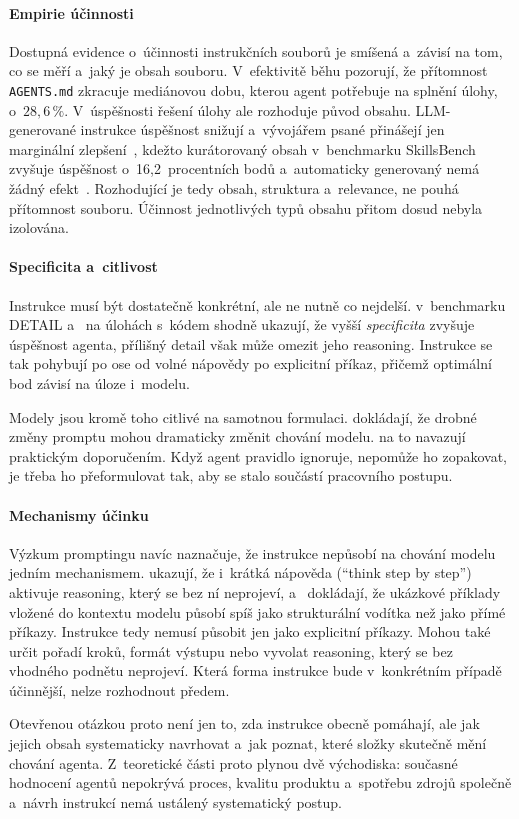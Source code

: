 \paragraph{Empirie účinnosti}
Dostupná evidence o~účinnosti instrukčních souborů je smíšená
a~závisí na tom, co se měří a~jaký je obsah souboru. V~efektivitě
běhu \textcite{lulla2026} pozorují, že přítomnost
\texttt{AGENTS.md} zkracuje mediánovou dobu, kterou agent
potřebuje na splnění úlohy, o~$28{,}6\,\%$. V~úspěšnosti řešení
úlohy ale rozhoduje původ obsahu. LLM-generované instrukce
úspěšnost snižují a~vývojářem psané přinášejí jen marginální
zlepšení~\cite{gloaguen2025agentsmd}, kdežto kurátorovaný obsah
v~benchmarku SkillsBench zvyšuje úspěšnost o~16,2~procentních
bodů a~automaticky generovaný nemá žádný
efekt~\cite{skillsbench2025}. Rozhodující je tedy obsah, struktura
a~relevance, ne pouhá přítomnost souboru. Účinnost jednotlivých
typů obsahu přitom dosud nebyla izolována.

\paragraph{Specificita a~citlivost}
Instrukce musí být dostatečně konkrétní, ale ne nutně co nejdelší.
\textcite{kim2025detail} v~benchmarku DETAIL a~\textcite{zi2025specificity}
na úlohách s~kódem shodně ukazují, že vyšší
\textit{specificita} zvyšuje úspěšnost agenta, přílišný detail
však může omezit jeho reasoning. Instrukce se tak pohybují po ose
od volné nápovědy po explicitní příkaz, přičemž optimální bod závisí
na úloze i~modelu.

Modely jsou kromě toho citlivé na samotnou formulaci. \textcite{razavi2025} dokládají, že drobné změny promptu
mohou dramaticky změnit chování modelu. \textcite{breunig2025}
na to navazují praktickým doporučením. Když agent pravidlo ignoruje,
nepomůže ho zopakovat, je třeba ho přeformulovat tak, aby se stalo
součástí pracovního postupu.

\paragraph{Mechanismy účinku}
Výzkum promptingu navíc naznačuje, že instrukce nepůsobí na chování
modelu jedním mechanismem. \textcite{wei2022cot} ukazují, že
i~krátká nápověda (``think step by step'') aktivuje reasoning, který
se bez ní neprojeví, a~\textcite{min2022rethinking} dokládají,
že ukázkové příklady vložené do kontextu modelu působí spíš jako
strukturální vodítka než jako přímé příkazy. Instrukce tedy nemusí
působit jen jako explicitní příkazy. Mohou také určit pořadí kroků,
formát výstupu nebo vyvolat reasoning, který se bez vhodného podnětu
neprojeví.
Která forma instrukce bude v~konkrétním případě účinnější, nelze
rozhodnout předem.

Otevřenou otázkou proto není jen to, zda instrukce obecně pomáhají,
ale jak jejich obsah systematicky navrhovat a~jak poznat, které
složky skutečně mění chování agenta. Z~teoretické části proto
plynou dvě východiska: současné hodnocení agentů nepokrývá proces,
kvalitu produktu a~spotřebu zdrojů společně a~návrh instrukcí nemá
ustálený systematický postup.
